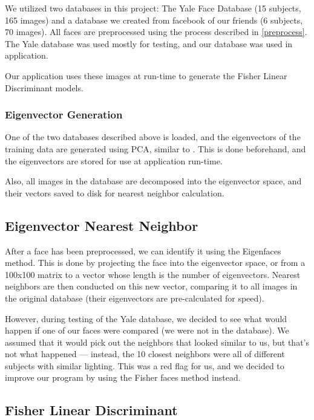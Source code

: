 We utilized two databases in this project: The Yale Face Database
\cite{YaleFace} (15 subjects, 165 images) and a database we created
from facebook of our friends (6 subjects, 70 images).  All faces are
preprocessed using the process described in \ref{preprocess}.  The
Yale database was used mostly for testing, and our database was used
in application.

Our application uses these images at run-time to generate the Fisher
Linear Discriminant models.

\subsubsection{Eigenvector Generation}

One of the two databases described above is loaded, and the
eigenvectors of the training data are generated using PCA, similar to
\cite{Eigenfaces}.  This is done beforehand, and the eigenvectors are
stored for use at application run-time.

Also, all images in the database are decomposed into the eigenvector
space, and their vectors saved to disk for nearest neighbor
calculation.

\subsection{Eigenvector Nearest Neighbor}

After a face has been preprocessed, we can identify it using the
Eigenfaces method.  This is done by projecting the face into the
eigenvector space, or from a 100x100 matrix to a vector whose length
is the number of eigenvectors.  Nearest neighbors are then conducted
on this new vector, comparing it to all images in the original
database (their eigenvectors are pre-calculated for speed).

However, during testing of the Yale database, we decided to see what
would happen if one of our faces were compared (we were not in the
database).  We assumed that it would pick out the neighbors that
looked similar to us, but that's not what happened --- instead, the 10
closest neighbors were all of different subjects with similar
lighting.  This was a red flag for us, and we decided to improve our
program by using the Fisher faces method instead.



\subsection{Fisher Linear Discriminant}

